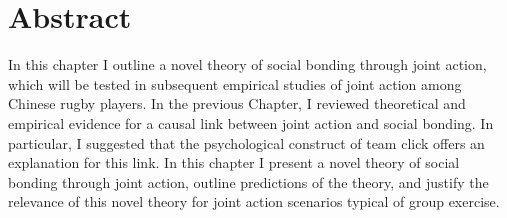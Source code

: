 \chapter*{Abstract}


  In this chapter I outline a novel theory of social bonding through joint action, which will be tested in subsequent empirical studies of joint action among Chinese rugby players.  In the previous Chapter, I reviewed theoretical and empirical evidence for a causal link between joint action and social bonding.  In particular, I suggested that the psychological construct of team click offers an explanation for this link. In this chapter I present a novel theory of social bonding through joint action, outline predictions of the theory, and justify the relevance of this novel theory for joint action scenarios typical of group exercise.

